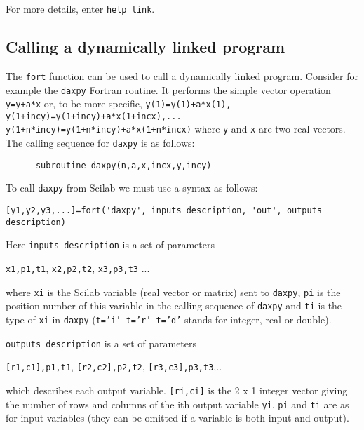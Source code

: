 For more details, enter {\tt help link}.

\subsection{Calling a dynamically linked program}

The {\tt fort} function can be used to call a dynamically linked
program. Consider for example the {\tt daxpy} Fortran routine. It performs 
the simple vector operation {\tt y=y+a*x} or, to be more specific,
{\tt y(1)=y(1)+a*x(1), y(1+incy)=y(1+incy)+a*x(1+incx),...
y(1+n*incy)=y(1+n*incy)+a*x(1+n*incx)} 
where {\tt y} and {\tt x} are two real vectors.
The calling sequence for {\tt daxpy} is as follows:
\begin{verbatim}
      subroutine daxpy(n,a,x,incx,y,incy)
\end{verbatim}
To call {\tt daxpy} from Scilab we must use a syntax as follows: 
\begin{verbatim}
[y1,y2,y3,...]=fort('daxpy', inputs description, 'out', outputs description)
\end{verbatim}
\noindent
Here {\tt inputs description} is a set of parameters
 
{\tt x1,p1,t1}, {\tt x2,p2,t2}, {\tt x3,p3,t3} ... 

\noindent
where {\tt xi} is the Scilab variable (real vector or matrix) sent to 
{\tt daxpy},
{\tt pi} is the position number of this variable in the calling
sequence of {\tt daxpy} and {\tt ti} is the type of {\tt xi} in {\tt daxpy}
({\tt t='i'  t='r'  t='d'} stands for integer, real or double).

\noindent
{\tt outputs description} is a set of parameters
 
{\tt [r1,c1],p1,t1}, {\tt [r2,c2],p2,t2}, {\tt [r3,c3],p3,t3},..

\noindent
which describes each output variable. {\tt [ri,ci]} is the
2 x 1 integer vector giving the number of rows and columns of the
ith output variable {\tt yi}. {\tt pi} and {\tt ti} are as for
input variables (they can be omitted if a variable is both input and
output). 

